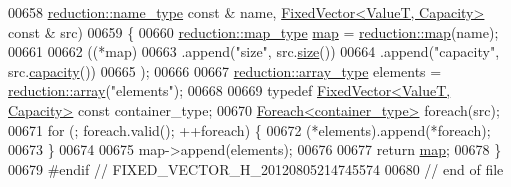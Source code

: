 \begin{DoxyCode}
00658     \hyperlink{classhryky_1_1reduction_1_1_string}{reduction::name_type} \textcolor{keyword}{const} & name, \hyperlink{classhryky_1_1_fixed_vector}{FixedVector<ValueT, Capacity>} \textcolor{keyword}{const} & 
      src)
00659 \{
00660     \hyperlink{classhryky_1_1_intrusive_ptr}{reduction::map_type} \hyperlink{namespacehryky_1_1reduction_ac5eae270cf8047b294dc4ff3e5e11a79}{map} = \hyperlink{namespacehryky_1_1reduction_ac5eae270cf8047b294dc4ff3e5e11a79}{reduction::map}(name);
00661 
00662     ((*map)
00663      .append(\textcolor{stringliteral}{"size"},        src.\hyperlink{classhryky_1_1_fixed_vector_a5213839602f1eabaa2e8ad064407e6bc}{size}())
00664      .append(\textcolor{stringliteral}{"capacity"},    src.\hyperlink{classhryky_1_1_fixed_vector_a5525e3acaa5aed71b4a267804d6ba42f}{capacity}())
00665      );
00666 
00667     \hyperlink{classhryky_1_1_intrusive_ptr}{reduction::array_type} elements = \hyperlink{namespacehryky_1_1reduction_a9d45a4dc1ea9a6668ebd192f296f788c}{reduction::array}(\textcolor{stringliteral}{"elements"});
00668 
00669     \textcolor{keyword}{typedef} \hyperlink{classhryky_1_1_fixed_vector}{FixedVector<ValueT, Capacity>} \textcolor{keyword}{const} container\_type;
00670     \hyperlink{classhryky_1_1_foreach}{Foreach<container_type>} \textcolor{keywordflow}{foreach}(src);
00671     \textcolor{keywordflow}{for} (; \textcolor{keywordflow}{foreach}.valid(); ++\textcolor{keywordflow}{foreach}) \{
00672         (*elements).append(*\textcolor{keywordflow}{foreach});
00673     \}
00674 
00675     map->append(elements);
00676     
00677     \textcolor{keywordflow}{return} \hyperlink{namespacehryky_1_1reduction_ac5eae270cf8047b294dc4ff3e5e11a79}{map};
00678 \}
00679 \textcolor{preprocessor}{#endif // FIXED\_VECTOR\_H\_20120805214745574}
00680 \textcolor{preprocessor}{}\textcolor{comment}{// end of file}
\end{DoxyCode}
